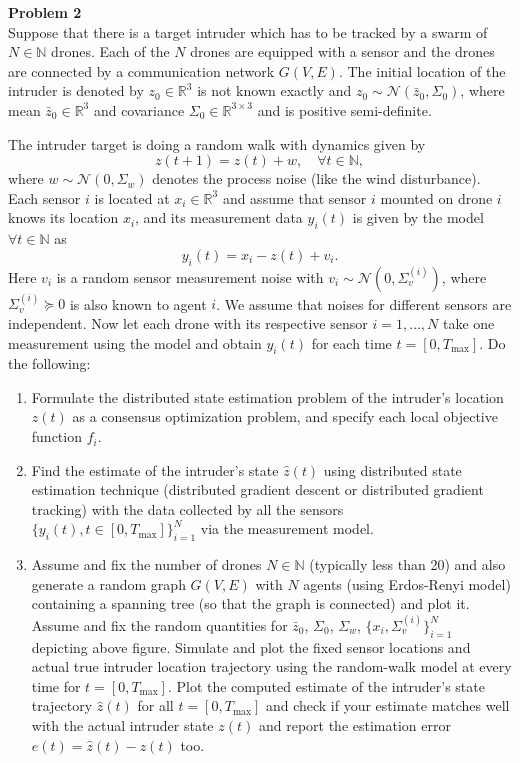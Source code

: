 \documentclass[a4paper,11pt]{article}
\newenvironment{problem}[1]
    {\begin{mdframed}[backgroundcolor=gray!20]\textbf{Problem #1}\\}
    {\end{mdframed}}
\newcommand{\R}{\mathbb{R}}
\newcommand{\N}{\mathbb{N}}
\begin{document}
\clearpage
\begin{problem}{2}
Suppose that there is a target intruder which has to be tracked by a swarm of $N\in\N$ drones.
Each of the $N$ drones are equipped with a sensor and the drones are connected by a communication
network $G(V,E)$. The initial location of the intruder is denoted by $z_0\in\R^3$ is not known
exactly and $z_0\sim\mathcal N(\bar z_0,\Sigma_0)$, where mean $\bar z_0\in\R^3$ and covariance
$\Sigma_0\in\R^{3\times3}$ and is positive semi-definite.

The intruder target is doing a random walk with dynamics given by
\[
z(t+1)=z(t)+w,\quad \forall t\in\N,
\]
where $w\sim\mathcal N(0,\Sigma_w)$ denotes the process noise (like the wind disturbance).
Each sensor $i$ is located at $x_i\in\R^3$ and assume that sensor $i$ mounted on drone $i$ knows
its location $x_i$, and its measurement data $y_i(t)$ is given by the model $\forall t\in\N$ as
\[
y_i(t)=x_i-z(t)+v_i.
\]
Here $v_i$ is a random sensor measurement noise with $v_i\sim\mathcal N(0,\Sigma_v^{(i)})$,
where $\Sigma_v^{(i)}\succeq0$ is also known to agent $i$. We assume that noises for different
sensors are independent. Now let each drone with its respective sensor $i=1,\ldots,N$ take one
measurement using the model and obtain $y_i(t)$ for each time $t=[0,T_{\max}]$. Do the following:
\begin{enumerate}
\item Formulate the distributed state estimation problem of the intruder's location $z(t)$ as a
consensus optimization problem, and specify each local objective function $f_i$.
\item Find the estimate of the intruder's state $\hat z(t)$ using distributed state estimation
technique (distributed gradient descent or distributed gradient tracking) with the data collected
by all the sensors $\{y_i(t),t\in[0,T_{\max}]\}_{i=1}^N$ via the measurement model.
\item Assume and fix the number of drones $N\in\N$ (typically less than 20) and also generate a
random graph $G(V,E)$ with $N$ agents (using Erdos-Renyi model) containing a spanning tree (so that
the graph is connected) and plot it. Assume and fix the random quantities for $\bar z_0$, $\Sigma_0$,
$\Sigma_w$, $\{x_i,\Sigma_v^{(i)}\}_{i=1}^N$ depicting above figure. Simulate and plot the fixed
sensor locations and actual true intruder location trajectory using the random-walk model at every
time for $t=[0,T_{\max}]$. Plot the computed estimate of the intruder's state trajectory $\hat z(t)$
for all $t=[0,T_{\max}]$ and check if your estimate matches well with the actual intruder state
$z(t)$ and report the estimation error $e(t)=\hat z(t)-z(t)$ too.
\end{enumerate}
\end{problem}
\end{document}
